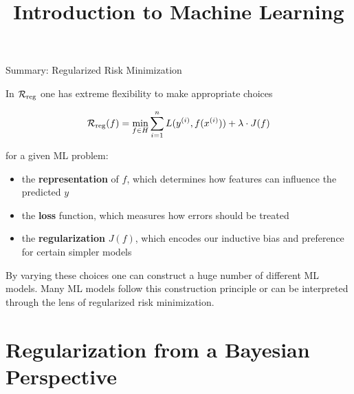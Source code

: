 



\newcommand{\titlefigure}{figure_man/bayes_reg.png}
\newcommand{\learninggoals}{
  \item \textcolor{blue}{XXX}
  \item \textcolor{blue}{XXX}
}

\title{Introduction to Machine Learning}
\date{}




\begin{vbframe}{Summary: Regularized Risk Minimization}

In $\mathcal{R}_{\text{reg}}$ one has extreme flexibility to make appropriate choices

$$
\mathcal{R}_{\text{reg}}(f)= \min_{f \in H} \sum_{i=1}^n L(y^{(i)}, f(x^{(i)})) + \lambda \cdot J(f)
$$


for a given ML problem:

\begin{itemize}
  \item the \textbf{representation} of $f$, which determines how features can influence the predicted $y$
  \item the \textbf{loss} function, which measures how errors should be treated
  \item the \textbf{regularization} $J(f)$, which encodes our inductive bias and preference for certain simpler models
\end{itemize}

By varying these choices one can construct a huge number of different ML models. Many ML models follow this construction principle or can be interpreted through the lens of regularized risk minimization.

\end{vbframe}

\section{Regularization from a Bayesian Perspective}


